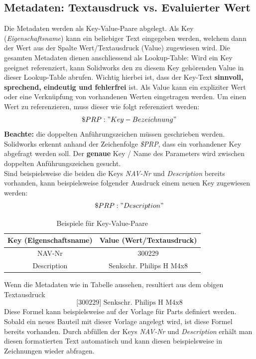 \documentclass[12pt,a4paper]{article}
\begin{document}
	\subsection{Metadaten: Textausdruck vs. Evaluierter Wert}
	Die Metadaten werden als Key-Value-Paare abgelegt. Als Key (\textit{Eigenschaftsname}) kann ein beliebiger Text eingegeben werden, welchem dann der Wert aus der Spalte Wert/Textausdruck (Value) zugewiesen wird. Die gesamten Metadaten dienen anschliessend als Lookup-Table: Wird ein Key geeignet referenziert, kann Solidworks den zu diesem Key gehörenden Value in dieser Lookup-Table abrufen. Wichtig hierbei ist, dass der Key-Text \textbf{sinnvoll, sprechend, eindeutig und fehlerfrei} ist. Als Value kann ein expliziter Wert oder eine Verknüpfung von vorhandenen Werten eingetragen werden. Um einen Wert zu referenzieren, muss dieser wie folgt referenziert werden:
	\begin{equation*}
		\$PRP:"Key-Bezeichnung"
	\end{equation*} 
	\textbf{Beachte: } die doppelten Anführungszeichen müssen geschrieben werden. Solidworks erkennt anhand der Zeichenfolge \textit{\$PRP}, dass ein vorhandener Key abgefragt werden soll. Der \textbf{genaue} Key / Name des Parameters wird zwischen doppelten Anführungszeichen gesucht.\\
	Sind beispielsweise die beiden die Keys \textit{NAV-Nr} und \textit{Description} bereits vorhanden, kann beispielsweise folgender Ausdruck einem neuen Key zugewiesen werden:
	\begin{eqnarray*}
		[\$PRP:"NAV-Nr"] \$PRP:"Description"
	\end{eqnarray*}
	\begin{table}[H]
		\centering
		\caption{Beispiele für Key-Value-Paare}
		\begin{tabular}{|c|c|}
			\hline
			Key (Eigenschaftsname) & Value (Wert/Textausdruck) \\
			\hline
			NAV-Nr & 300229 \\
			\hline
			Description & Senkschr. Philips H M4x8 \\
			\hline
		\end{tabular}
	\end{table}
\noindent
	Wenn die Metadaten wie in Tabelle aussehen, resultiert aus dem obigen Textausdruck 
	\begin{equation*}
		\text{[300229] Senkschr. Philips H M4x8}
	\end{equation*}
	Diese Formel kann beispielsweise auf der Vorlage für Parts definiert werden. Sobald ein neues Bauteil mit dieser Vorlage angelegt wird, ist diese Formel bereits vorhanden. Durch abfüllen der Keys \textit{NAV-Nr} und \textit{Description} erhält man diesen formatierten Text automatisch und kann diesen beispielsweise in Zeichnungen wieder abfragen.
\end{document}
